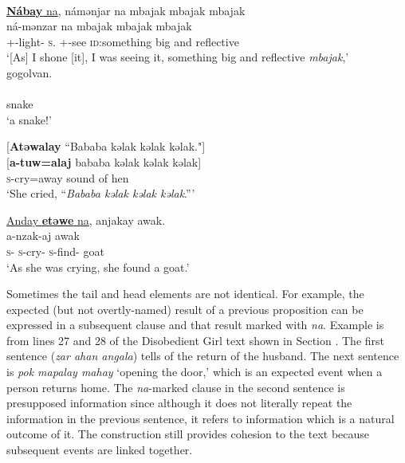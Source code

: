 \medskip
{}\\
\underline{\textbf{Nábay}  na},  námənjar  na  mbajak  mbajak  mbajak\\  
\gll  {}  ná-mənzar na {mbajak   mbajak    mbajak}\\ 
      {\oneS}+{\IFV}-light{}-{\CL}    \textsc{s}.{\DO}   {\oneS}+{\IFV}-see  {\PSP}  {\textsc{id}:something big and reflective}\\   
\glt ‘[As] I shone [it], I was seeing it, something big and reflective \textit{mbajak},’\\
      
      \medskip
gogolvan.\\      
 \\
     snake\\
\glt  ‘a snake!’
\z


\ea \label{ex:11:25}
{}[\textbf{Atəwalay} “Bababa  kəlak  kəlak  kəlak."]\\  
\gll  {}[\textbf{a-tuw=alaj} {bababa  kəlak kəlak kəlak}]\\ 
      \textsc{s}-cry=away {sound of hen}\\ 
\glt ‘She cried, “\textit{Bababa kəlak  kəlak  kəlak}.”’

\medskip
\underline{Anday  \textbf{etəwe}  na},  anjakay  awak.\\
\gll {}   a-nzak-aj   awak\\
     \textsc{s}-{\PRG}  \textsc{s}-cry-{\CL}  {\PSP}  \textsc{s}-find-{\CL}  goat\\
\glt  ‘As she was crying, she found a goat.’ 
\z

Sometimes the tail and head elements are not identical. For example, the expected (but not overtly-named) result of a previous proposition can be expressed in a subsequent clause and that result marked with \textit{na}. Example  is from lines 27 and 28 of the Disobedient Girl text shown in Section . The first sentence (\textit{zar ahan angala}) tells of the return of the husband. The next sentence is \textit{pok mapalay mahay} ‘opening the door,’ which is an expected event when a person returns home. The \textit{na}{}-marked clause in the second sentence is presupposed information since although it does not literally repeat the information in the previous sentence, it refers to information which is a natural outcome of it. The construction still provides cohesion to the text because subsequent events are linked together. 


